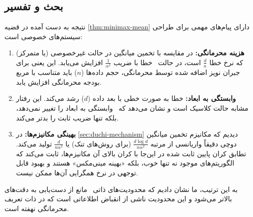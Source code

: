 \subsection{بحث و تفسیر}
نتیجه به دست آمده در قضیه \ref{thm:minimax-mean} دارای پیام‌های مهمی برای طراحی سیستم‌های خصوصی است:

\begin{enumerate}
    \item \textbf{هزینه محرمانگی:} در مقایسه با تخمین میانگین در حالت غیرخصوصی (یا متمرکز) که نرخ خطا $\frac{d}{n}$ است، در حالت \LDP\ خطا با ضریب $\frac{1}{\alpha^2}$ افزایش می‌یابد. این یعنی برای جبران نویز اضافه شده توسط محرمانگی، حجم داده‌ها ($n$) باید متناسب با مربع بودجه محرمانگی افزایش یابد.
    
    \item \textbf{وابستگی به ابعاد:} خطا به صورت خطی با بعد داده ($d$) رشد می‌کند. این رفتار مشابه حالت کلاسیک است و نشان می‌دهد که \LDP\ وابستگی به ابعاد را تغییر نمی‌دهد، بلکه تنها ضریب ثابت را بدتر می‌کند.
    
    \item \textbf{بهینگی مکانیزم‌ها:} در \ref{sec:duchi-mechanism} دیدیم که مکانیزم تخمین میانگین دوچی دقیقاً واریانسی از مرتبه $\frac{d \log d}{n \alpha^2}$ (برای روش‌های تنک) یا $\frac{d}{n \alpha^2}$ تولید می‌کند. تطابق کران پایین ثابت شده در این‌جا با کران بالای آن مکانیزم‌ها، ثابت می‌کند که الگوریتم‌های موجود نه تنها خوب، بلکه «بهینه مینی‌مکس» هستند و بهبود قابل توجهی در نرخ همگرایی آن‌ها ممکن نیست.
\end{enumerate}

به این ترتیب، ما نشان دادیم که محدودیت‌های ذاتی \LDP\ مانع از دست‌یابی به دقت‌های بالاتر می‌شود و این محدودیت ناشی از انقباض اطلاعاتی است که در ذات تعریف محرمانگی نهفته است.